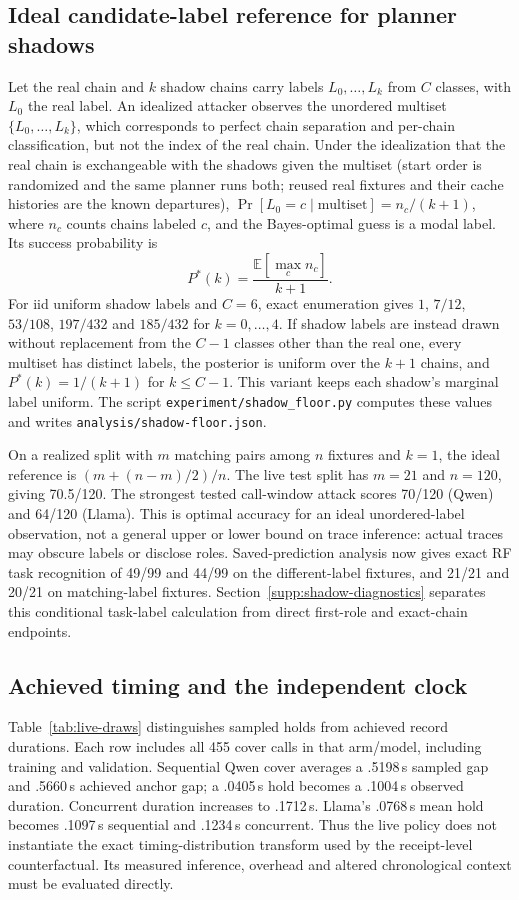\subsection{Ideal candidate-label reference for planner shadows}\label{sec:supp-floor}
Let the real chain and $k$ shadow chains carry labels $L_0,\dots,L_k$ from $C$ classes, with $L_0$ the real label. An idealized attacker observes the unordered multiset $\{L_0,\dots,L_k\}$, which corresponds to perfect chain separation and per-chain classification, but not the index of the real chain. Under the idealization that the real chain is exchangeable with the shadows given the multiset (start order is randomized and the same planner runs both; reused real fixtures and their cache histories are the known departures), $\Pr[L_0=c\mid\text{multiset}]=n_c/(k+1)$, where $n_c$ counts chains labeled $c$, and the Bayes-optimal guess is a modal label. Its success probability is
\[P^*(k)=\frac{\mathbb{E}[\max_c n_c]}{k+1}.\]
For iid uniform shadow labels and $C=6$, exact enumeration gives $1$, $7/12$, $53/108$, $197/432$ and $185/432$ for $k=0,\dots,4$. If shadow labels are instead drawn without replacement from the $C-1$ classes other than the real one, every multiset has distinct labels, the posterior is uniform over the $k+1$ chains, and $P^*(k)=1/(k+1)$ for $k\le C-1$. This variant keeps each shadow's marginal label uniform. The script \texttt{experiment/shadow\_floor.py} computes these values and writes \texttt{analysis/shadow-floor.json}.

On a realized split with $m$ matching pairs among $n$ fixtures and $k=1$, the ideal reference is $(m+(n-m)/2)/n$. The live test split has $m=21$ and $n=120$, giving 70.5/120. The strongest tested call-window attack scores 70/120 (Qwen) and 64/120 (Llama). This is optimal accuracy for an ideal unordered-label observation, not a general upper or lower bound on trace inference: actual traces may obscure labels or disclose roles. Saved-prediction analysis now gives exact RF task recognition of 49/99 and 44/99 on the different-label fixtures, and 21/21 and 20/21 on matching-label fixtures. Section~\ref{supp:shadow-diagnostics} separates this conditional task-label calculation from direct first-role and exact-chain endpoints.

\subsection{Achieved timing and the independent clock}
Table~\ref{tab:live-draws} distinguishes sampled holds from achieved record durations. Each row includes all 455 cover calls in that arm/model, including training and validation. Sequential Qwen cover averages a .5198\,s sampled gap and .5660\,s achieved anchor gap; a .0405\,s hold becomes a .1004\,s observed duration. Concurrent duration increases to .1712\,s. Llama's .0768\,s mean hold becomes .1097\,s sequential and .1234\,s concurrent. Thus the live policy does not instantiate the exact timing-distribution transform used by the receipt-level counterfactual. Its measured inference, overhead and altered chronological context must be evaluated directly.

